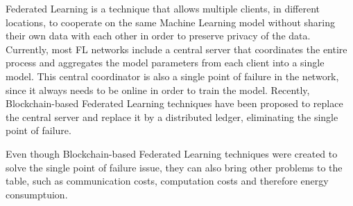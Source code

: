 Federated Learning is a technique that allows multiple clients, in different locations, to cooperate on the same Machine Learning model without sharing their own data with each other in order to preserve privacy of the data. Currently, most FL networks include a central server that coordinates the entire process and aggregates the model parameters from each client into a single model. This central coordinator is also a single point of failure in the network, since it always needs to be online in order to train the model. Recently, Blockchain-based Federated Learning techniques have been proposed to replace the central server and replace it by a distributed ledger, eliminating the single point of failure.

Even though Blockchain-based Federated Learning techniques were created to solve the single point of failure issue, they can also bring other problems to the table, such as communication costs, computation costs and therefore energy consumptuion. 






